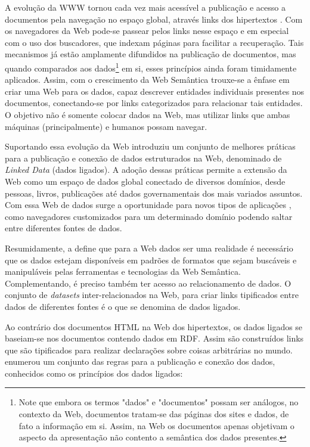 A evolução da WWW tornou cada vez mais acessível a publicação e acesso a documentos pela navegação no espaço global, através links dos hipertextos \citep{Bizer2009}. Com os navegadores da Web pode-se passear pelos links nesse espaço e em especial com o uso dos buscadores, que indexam páginas para facilitar a recuperação. Tais mecanismos já estão amplamente difundidos na publicação de documentos, mas quando comparados aos dados\footnote{Note que embora os termos "dados" e "documentos" possam ser análogos, no contexto da Web, documentos tratam-se das páginas dos sites e dados, de fato a informação em si. Assim, na Web os documentos apenas objetivam o aspecto da apresentação não contento a semântica dos dados presentes.} em si, esses princípios ainda foram timidamente aplicados. Assim, com o crescimento da Web Semântica trouxe-se a ênfase em criar uma Web para os dados, capaz descrever entidades individuais presentes nos documentos, conectando-se por links categorizados para relacionar tais entidades. O objetivo não é somente colocar dados na Web, mas utilizar links que ambas máquinas (principalmente) e humanos possam navegar.

Suportando essa evolução da Web \citep{LinkedData:2006} introduziu um conjunto de melhores práticas para a publicação e conexão de dados estruturados na Web, denominado de \textit{Linked Data} (dados ligados). A adoção dessas práticas permite a extensão da Web como um espaço de dados global conectado de diversos domínios, desde pessoas, livros, publicações até dados governamentais dos mais variados assuntos. Com essa Web de dados surge a oportunidade para novos tipos de aplicações \citep{Bizer2009}, como navegadores customizados para um determinado domínio podendo saltar entre diferentes fontes de dados.

Resumidamente, a \cite{LinkedDataW3C} define que para a Web dados ser uma realidade é necessário que os dados estejam disponíveis em padrões de formatos que sejam buscáveis e manipuláveis pelas ferramentas e tecnologias da Web Semântica. Complementando, é preciso também ter acesso ao relacionamento de dados. O conjunto de \textit{datasets} inter-relacionados na Web, para criar links tipificados entre dados de diferentes fontes é o que se denomina de dados ligados.

Ao contrário dos documentos \ac{HTML} na Web dos hipertextos, os dados ligados se baseiam-se nos documentos contendo dados em RDF. Assim são construídos links que são tipificados para realizar declarações sobre coisas arbitrárias no mundo. \cite{LinkedData:2006} enumerou um conjunto das regras para a publicação e conexão dos dados, conhecidos como os princípios dos dados ligados:

